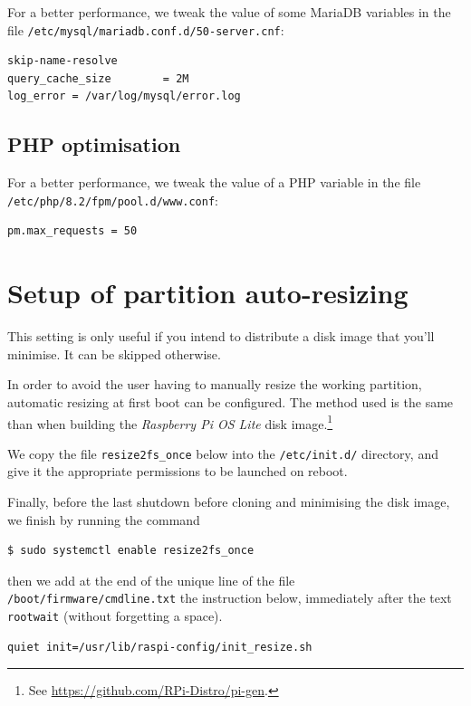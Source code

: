 \documentclass[12pt]{article}
\begin{document}
For a better performance, we tweak the value of some MariaDB variables in the file \lstinline{/etc/mysql/mariadb.conf.d/50-server.cnf}:
\begin{lstlisting}[language=bash]
skip-name-resolve
query_cache_size        = 2M
log_error = /var/log/mysql/error.log
\end{lstlisting}

\subsection{PHP optimisation}\label{ssec-php-optimisation}

For a better performance, we tweak the value of a PHP variable in the file \lstinline{/etc/php/8.2/fpm/pool.d/www.conf}:
\begin{lstlisting}[language=bash]
pm.max_requests = 50
\end{lstlisting}

\section{Setup of partition auto-resizing}

This setting is only useful if you intend to distribute a disk image that you'll minimise.
It can be skipped otherwise.

In order to avoid the user having to manually resize the working partition, automatic resizing at first boot can be configured.
The method used is the same than when building the \emph{Raspberry Pi OS Lite} disk image.\footnote{See \url{https://github.com/RPi-Distro/pi-gen}.}

We copy the file \lstinline{resize2fs_once} below into the \lstinline{/etc/init.d/} directory, and give it the appropriate permissions to be launched on reboot.


Finally, before the last shutdown before cloning and minimising the disk image, we finish by running the command
\begin{lstlisting}[language=bash]
$ sudo systemctl enable resize2fs_once
\end{lstlisting}
then we add at the end of the unique line of the file \lstinline{/boot/firmware/cmdline.txt} the instruction below, immediately after the text \lstinline{rootwait} (without forgetting a space).
\begin{lstlisting}[language=bash]
quiet init=/usr/lib/raspi-config/init_resize.sh
\end{lstlisting}
\end{document}
